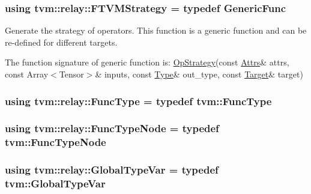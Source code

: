 \subsubsection[{\texorpdfstring{F\+T\+V\+M\+Strategy}{FTVMStrategy}}]{\setlength{\rightskip}{0pt plus 5cm}using {\bf tvm\+::relay\+::\+F\+T\+V\+M\+Strategy} = typedef {\bf Generic\+Func}}\hypertarget{namespacetvm_1_1relay_a2eb2ad4e7a83e0a28e2ad073d7bf9305}{}\label{namespacetvm_1_1relay_a2eb2ad4e7a83e0a28e2ad073d7bf9305}


Generate the strategy of operators. This function is a generic function and can be re-\/defined for different targets. 

The function signature of generic function is\+: \hyperlink{classtvm_1_1relay_1_1OpStrategy}{Op\+Strategy}(const \hyperlink{classtvm_1_1Attrs}{Attrs}\& attrs, const Array$<$\+Tensor$>$\& inputs, const \hyperlink{classtvm_1_1Type}{Type}\& out\+\_\+type, const \hyperlink{classtvm_1_1Target}{Target}\& target) 
\subsubsection[{\texorpdfstring{Func\+Type}{FuncType}}]{\setlength{\rightskip}{0pt plus 5cm}using {\bf tvm\+::relay\+::\+Func\+Type} = typedef {\bf tvm\+::\+Func\+Type}}\hypertarget{namespacetvm_1_1relay_aa475de90506d48a1bb04ef6d1bd99bfb}{}\label{namespacetvm_1_1relay_aa475de90506d48a1bb04ef6d1bd99bfb}
\subsubsection[{\texorpdfstring{Func\+Type\+Node}{FuncTypeNode}}]{\setlength{\rightskip}{0pt plus 5cm}using {\bf tvm\+::relay\+::\+Func\+Type\+Node} = typedef {\bf tvm\+::\+Func\+Type\+Node}}\hypertarget{namespacetvm_1_1relay_ab551714015417af28d5ca2b47722997e}{}\label{namespacetvm_1_1relay_ab551714015417af28d5ca2b47722997e}
\subsubsection[{\texorpdfstring{Global\+Type\+Var}{GlobalTypeVar}}]{\setlength{\rightskip}{0pt plus 5cm}using {\bf tvm\+::relay\+::\+Global\+Type\+Var} = typedef {\bf tvm\+::\+Global\+Type\+Var}}\hypertarget{namespacetvm_1_1relay_a2235e350f9cd1eac3aa0177034976043}{}\label{namespacetvm_1_1relay_a2235e350f9cd1eac3aa0177034976043}
